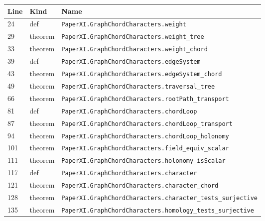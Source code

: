 \documentclass[10pt,oneside]{book}
\begin{document}
\begin{longtable}{@{}p{}p{}p{}@{}}\toprule Line&Kind&Name\\\midrule\endhead

24&def&\nolinkurl{PaperXI.GraphChordCharacters.weight}\\

29&theorem&\nolinkurl{PaperXI.GraphChordCharacters.weight_tree}\\

33&theorem&\nolinkurl{PaperXI.GraphChordCharacters.weight_chord}\\

39&def&\nolinkurl{PaperXI.GraphChordCharacters.edgeSystem}\\

43&theorem&\nolinkurl{PaperXI.GraphChordCharacters.edgeSystem_chord}\\

49&theorem&\nolinkurl{PaperXI.GraphChordCharacters.traversal_tree}\\

66&theorem&\nolinkurl{PaperXI.GraphChordCharacters.rootPath_transport}\\

81&def&\nolinkurl{PaperXI.GraphChordCharacters.chordLoop}\\

87&theorem&\nolinkurl{PaperXI.GraphChordCharacters.chordLoop_transport}\\

94&theorem&\nolinkurl{PaperXI.GraphChordCharacters.chordLoop_holonomy}\\

101&theorem&\nolinkurl{PaperXI.GraphChordCharacters.field_equiv_scalar}\\

111&theorem&\nolinkurl{PaperXI.GraphChordCharacters.holonomy_isScalar}\\

117&def&\nolinkurl{PaperXI.GraphChordCharacters.character}\\

121&theorem&\nolinkurl{PaperXI.GraphChordCharacters.character_chord}\\

128&theorem&\nolinkurl{PaperXI.GraphChordCharacters.character_tests_surjective}\\

135&theorem&\nolinkurl{PaperXI.GraphChordCharacters.homology_tests_surjective}\\

\bottomrule\end{longtable}
\end{document}
